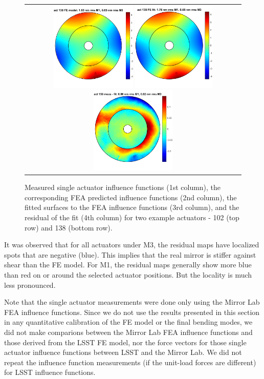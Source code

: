 \documentclass [twoside,openbib,12pt]{article}
\begin{document}
\begin{figure}[bthp]
\begin{center}
\begin{tabular}{c}
       \includegraphics[width=41mm]{figures/if138f.png}
       \includegraphics[width=40mm]{figures/if138fit.png}
       \includegraphics[width=41mm]{figures/if138r.png}
  \end{tabular}
   \end{center}
   \caption
   { \label{fig:IFeg}
     Measured single actuator influence functions (1st column), the
     corresponding FEA predicted influence functions (2nd column), the
     fitted surfaces to the FEA influence functions (3rd column), and
     the residual of the fit (4th column) for two example actuators -
     102 (top row) and 138 (bottom row).
 }
\end{figure}

It was observed that for all actuators under M3, the residual maps
have localized spots that are negative (blue). This implies that the real
mirror is stiffer against shear than the FE model.
For M1, the residual maps generally show more blue than red on or
around the selected actuator positions. But the locality is much less pronounced.

Note that the single actuator measurements were done only
using the Mirror Lab FEA influence functions.
Since we do not use the results presented in this section in any
quantitative calibration of the FE model or the final bending modes,
we did not make comparions between the Mirror Lab FEA influence
functions and those derived from the LSST FE model, nor the force
vectors for those single actuator influence functions between LSST and
the Mirror Lab.
We did not repeat the influence function measurements (if the
unit-load forces
are different) for LSST influence functions.
\end{document}
